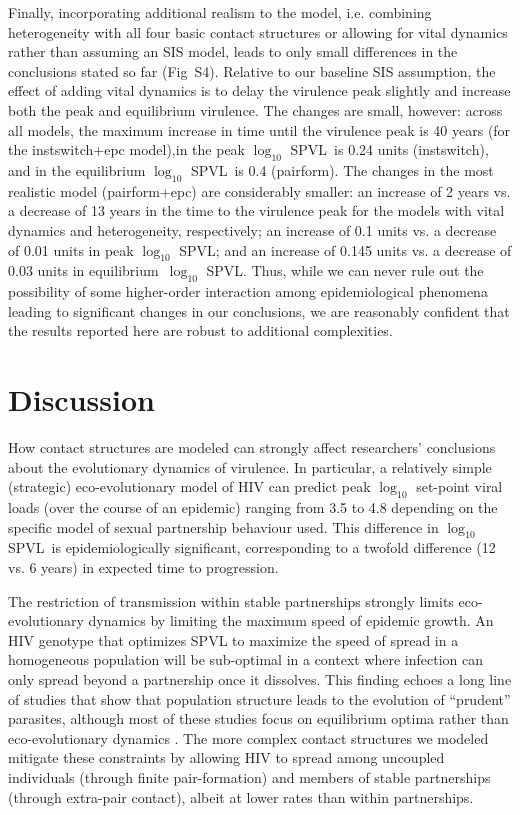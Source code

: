 \documentclass[10pt,letterpaper]{article}
\renewcommand{\figurename}{Fig}
\newcommand{\Lspvl}{$\log_{10}$ SPVL}
\begin{document}
Finally, incorporating additional realism to the model, i.e.
combining heterogeneity with all four basic contact structures or
allowing for vital dynamics rather than assuming an SIS model,
leads to only small differences in the conclusions stated so far
(\figurename~S4). Relative to our baseline SIS assumption, the
effect of adding vital dynamics is to delay the virulence peak
slightly and increase both the peak and equilibrium virulence.
The changes are small, however: across all models, the
maximum increase in time until
the virulence peak is 40 years (for the instswitch+epc model),in 
the peak \Lspvl\ is 0.24 units (instswitch), and in the equilibrium
\Lspvl\ is 0.4 (pairform). The changes in the most realistic
model (pairform+epc) are considerably smaller: 
an increase of 2 years vs. a decrease of 13 years in the
time to the virulence peak for the
models with vital dynamics and heterogeneity, respectively;
an increase of 0.1 units vs. a decrease of 0.01 units in peak \Lspvl;
and an increase of 0.145 units vs. a decrease of 0.03 units
in equilibrium~\Lspvl. Thus, while we can never rule out the
possibility of some higher-order interaction among epidemiological
phenomena leading to significant changes in our conclusions,
we are reasonably confident that the results reported here are
robust to additional complexities.

\section*{Discussion}

How contact structures are modeled can strongly affect
researchers' conclusions about the evolutionary dynamics of
virulence. In particular, a relatively simple (strategic) 
eco-evolutionary model of HIV can predict peak $\log_{10}$
set-point viral loads (over the course of an epidemic)
ranging from 3.5 to 4.8 depending on the specific model
of sexual partnership behaviour used. This difference in \Lspvl\ is
epidemiologically significant, corresponding to a twofold difference
(12 vs. 6 years) in expected time to progression.

The restriction of transmission within stable partnerships
strongly limits eco-evolutionary dynamics by
limiting the maximum speed of epidemic growth. An HIV genotype
that optimizes SPVL to maximize the speed of spread in
a homogeneous population will be sub-optimal in a context
where infection can only spread beyond a partnership once
it dissolves. This finding echoes a long line of
studies that show that population structure leads to the
evolution of ``prudent'' parasites, although most of these studies
focus on equilibrium optima rather than eco-evolutionary dynamics
\cite{Herre1995,Kerr+2006,webb_theoretical_2013,berngruber_spatial_2015}. 
The more complex contact structures we modeled
mitigate these constraints by allowing HIV to spread among uncoupled individuals (through finite pair-formation) and members of stable partnerships
(through extra-pair contact), albeit at lower rates than within
partnerships.
\end{document}
